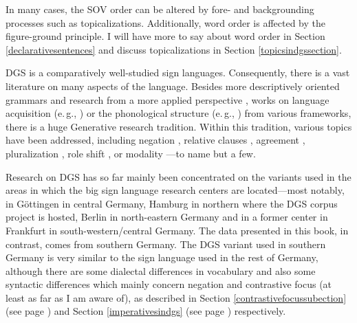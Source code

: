 \begin{exe}
\ex \label{ex:basciclausstructure}
\end{exe}


\noindent In many cases, the SOV order can be altered by fore- and backgrounding processes such as topicalizations. Additionally, word order is affected by the figure-ground principle. I will have more to say about word order in Section \ref{declarativesentences} and discuss topicalizations in Section \ref{topicsindgssection}. 

DGS is a comparatively well-studied sign languages. Consequently, there is a vast literature on many aspects of the language. Besides more descriptively oriented grammars \citep{papaspyrou2008grammatik,happ2014vork} and research from a more applied perspective \citep{eichmannhansenhessmann2012,dumig2013}, works on language acquisition (e.\,g., \citealt{leuninger1997lena,hanel2005spracherwerb,haenelfaul2012erwerb}) or the phonological structure (e.\,g., \citealt{benner2012,herrmann2012prosody,dumig2013}) from various frameworks, there is a huge Generative research tradition. Within this tradition, various topics have been addressed, including negation \citep{pfau2008headshake,pfau2016featural}, relative clauses \citep{pfau2005relative}, agreement \citep{pfau2006thedevelopment,steinbach2007grammaticalization,steinbach2011agreement,pfausalzmannsteinbach2018agreement}, pluralization \citep{pfausteinbach2004}, role shift \citep{hermannsteinbach2012quotation}, or modality \citep{herrmann2007,herrmann2013modal}---to name but a few.

Research on DGS has so far mainly been concentrated on the variants used in the areas in which the big sign language research centers are located---most notably, in Göttingen in central Germany, Hamburg in northern where the DGS corpus project \citep{jahn2018} is hosted, Berlin in north-eastern Germany and in a former center in Frankfurt in south-western/central Germany. The data presented in this book, in contrast, comes from southern Germany. The DGS variant used in southern Germany is very similar to the sign language used in the rest of Germany, although there are some dialectal differences in vocabulary and also some syntactic differences which mainly concern negation and contrastive focus (at least as far as I am aware of), as described in Section \ref{contrastivefocussubection} (see page \pageref{contrastivefocus}) and Section \ref{imperativesindgs} (see page \pageref{negationnegaation}) respectively. 

